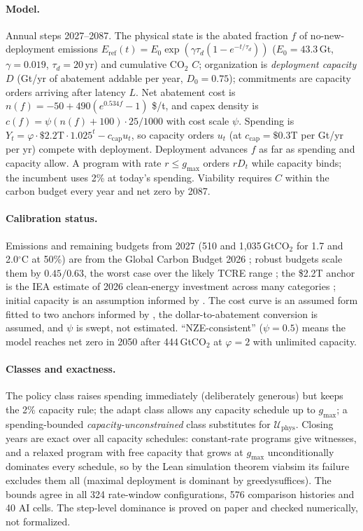 \documentclass[11pt]{article}
\theoremstyle{plain}
\theoremstyle{definition}
\newcommand{\U}{\mathcal{U}}
\newcommand{\phys}{\mathrm{phys}}
\newcommand{\lean}[1]{{\ttfamily\renewcommand{\_}{\textunderscore\allowbreak}#1}}
\begin{document}
\paragraph{Model.} Annual steps 2027--2087. The physical state is the abated fraction $f$ of no-new-deployment emissions $E_{\mathrm{ref}}(t)=E_0\exp(\gamma\tau_d(1-e^{-t/\tau_d}))$ ($E_0=43.3$\,Gt, $\gamma=0.019$, $\tau_d=20$\,yr) and cumulative CO$_2$ $C$; organization is \emph{deployment capacity} $D$ (Gt/yr of abatement addable per year, $D_0=0.75$); commitments are capacity orders arriving after latency $L$. Net abatement cost is $n(f)=-50+490(e^{0.534f}-1)$ \$/t, and capex density is $c(f)=\psi(n(f)+100)\cdot25/1000$ with cost scale $\psi$. Spending is $Y_t=\varphi\cdot\$2.2\mathrm{T}\cdot1.025^t-c_{\mathrm{cap}}u_t$, so capacity orders $u_t$ (at $c_{\mathrm{cap}}=\$0.3$T per Gt/yr per yr) compete with deployment. Deployment advances $f$ as far as spending and capacity allow. A program with rate $r\le g_{\max}$ orders $rD_t$ while capacity binds; the incumbent uses 2\% at today's spending. Viability requires $C$ within the carbon budget every year and net zero by 2087.

\paragraph{Calibration status.} Emissions and remaining budgets from 2027 (510 and 1,035\,GtCO$_2$ for 1.7 and 2.0$^\circ$C at 50\%) are from the Global Carbon Budget 2026 \citep{FriedlingsteinEtAl2026}; robust budgets scale them by $0.45/0.63$, the worst case over the likely TCRE range \citep{IPCCWGISPM2021}; the \$2.2T anchor is the IEA estimate of 2026 clean-energy investment across many categories \citep{IEAWorldEnergyInvestment2026}; initial capacity is an assumption informed by \citet{EmberCapacity2026}. The cost curve is an assumed form fitted to two anchors informed by \citet{IPCCWGIIISPM2022}, the dollar-to-abatement conversion is assumed, and $\psi$ is swept, not estimated. ``NZE-consistent'' ($\psi=0.5$) means the model reaches net zero in 2050 after 444\,GtCO$_2$ at $\varphi=2$ with unlimited capacity.

\paragraph{Classes and exactness.} The policy class raises spending immediately (deliberately generous) but keeps the 2\% capacity rule; the adapt class allows any capacity schedule up to $g_{\max}$; a spending-bounded \emph{capacity-unconstrained} class substitutes for $\U_\phys$. Closing years are exact over all capacity schedules: constant-rate programs give witnesses, and a relaxed program with free capacity that grows at $g_{\max}$ unconditionally dominates every schedule, so by the Lean simulation theorem \lean{viab\_sim} its failure excludes them all (maximal deployment is dominant by \lean{greedy\_suffices}). The bounds agree in all 324 rate-window configurations, 576 comparison histories and 40 AI cells. The step-level dominance is proved on paper and checked numerically, not formalized.
\end{document}
